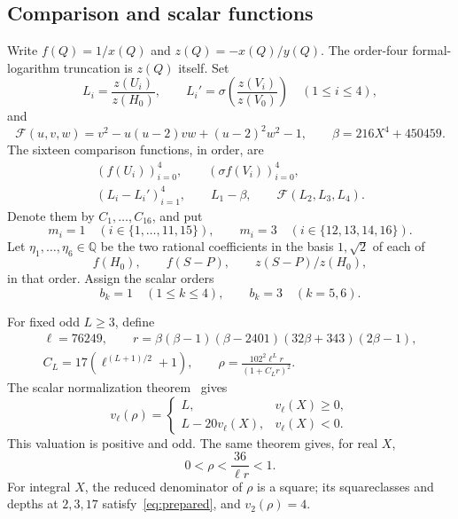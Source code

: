 \documentclass[11pt,a4paper]{article}
\newcommand{\Q}{\mathbb Q}\newcommand{\Z}{\mathbb Z}
\begin{document}
\subsection{Comparison and scalar functions}

Write $f(Q)=1/x(Q)$ and $z(Q)=-x(Q)/y(Q)$. The order-four
formal-logarithm truncation is $z(Q)$ itself. Set
\[
 L_i=\frac{z(U_i)}{z(H_0)},\qquad
 L_i'=\sigma\left(\frac{z(V_i)}{z(V_0)}\right)
 \quad(1\le i\le4),
\]
and
\[
 \mathcal F(u,v,w)=v^2-u(u-2)vw+(u-2)^2w^2-1,
 \qquad \beta=216X^4+450459.
\]
The sixteen comparison functions, in order, are
\begin{equation}\label{eq:comparisons}
 \begin{gathered}
 (f(U_i))_{i=0}^4,\qquad (\sigma f(V_i))_{i=0}^4,\\
 (L_i-L_i')_{i=1}^4,\qquad L_1-\beta,\qquad
                              \mathcal F(L_2,L_3,L_4).
 \end{gathered}
\end{equation}
Denote them by $C_1,\ldots,C_{16}$, and put
\[
 m_i=1\quad(i\in\{1,\ldots,11,15\}),\qquad
 m_i=3\quad(i\in\{12,13,14,16\}).
\]
Let $\eta_1,\ldots,\eta_6\in\Q$ be the two rational coefficients
in the basis $1,\sqrt2$ of each of
\begin{equation}\label{eq:scalar-functions}
             f(H_0),\qquad f(S-P),\qquad z(S-P)/z(H_0),
\end{equation}
in that order. Assign the scalar orders
\[
 b_k=1\quad(1\le k\le4),\qquad b_k=3\quad(k=5,6).
\]

For fixed odd $L\ge3$, define
\begin{equation}\label{eq:rho}
 \begin{gathered}
 \ell=76249,\qquad
 r=\beta(\beta-1)(\beta-2401)(32\beta+343)(2\beta-1),\\
 C_L=17(\ell^{(L+1)/2}+1),\qquad
 \rho=\frac{102^2\ell^Lr}{(1+C_Lr)^2}.
 \end{gathered}
\end{equation}
The scalar normalization theorem~\cite{Normalizer} gives
\begin{equation}\label{eq:forcedrho}
 v_\ell(\rho)=
 \begin{cases}L,&v_\ell(X)\ge0,\\L-20v_\ell(X),&v_\ell(X)<0.
 \end{cases}
\end{equation}
This valuation is positive and odd. The same theorem gives, for real $X$,
\begin{equation}\label{eq:smallrho}
                  0<\rho<\frac{36}{\ell r}<1.
\end{equation}
For integral $X$, the reduced denominator of $\rho$ is a square;
its squareclasses and depths at $2,3,17$ satisfy~\eqref{eq:prepared},
and $v_2(\rho)=4$.
\end{document}
